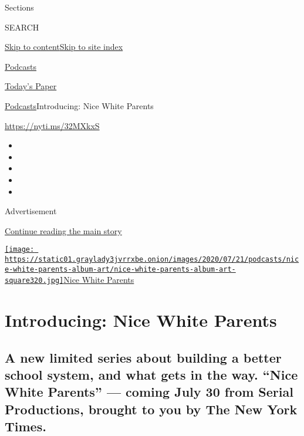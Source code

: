 Sections

SEARCH

\protect\hyperlink{site-content}{Skip to
content}\protect\hyperlink{site-index}{Skip to site index}

\href{https://www.nytimes3xbfgragh.onion/spotlight/podcasts}{Podcasts}

\href{https://myaccount.nytimes3xbfgragh.onion/auth/login?response_type=cookie\&client_id=vi}{}

\href{https://www.nytimes3xbfgragh.onion/section/todayspaper}{Today's
Paper}

\href{/spotlight/podcasts}{Podcasts}\textbar{}Introducing: Nice White
Parents

\url{https://nyti.ms/32MXkxS}

\begin{itemize}
\item
\item
\item
\item
\item
\end{itemize}

Advertisement

\protect\hyperlink{after-top}{Continue reading the main story}

\href{https://www.nytimes3xbfgragh.onion/column/nice-white-parents}{\texttt{[image: https://static01.graylady3jvrrxbe.onion/images/2020/07/21/podcasts/nice-white-parents-album-art/nice-white-parents-album-art-square320.jpg]}Nice
White Parents}

\hypertarget{introducing-nice-white-parents}{%
\section{Introducing: Nice White
Parents}\label{introducing-nice-white-parents}}

\hypertarget{a-new-limited-series-about-building-a-better-school-system-and-what-gets-in-the-way-nice-white-parents--coming-july-30-from-serial-productions-brought-to-you-by-the-new-york-times}{%
\subsection{A new limited series about building a better school system,
and what gets in the way. ``Nice White Parents'' --- coming July 30 from
Serial Productions, brought to you by The New York
Times.}\label{a-new-limited-series-about-building-a-better-school-system-and-what-gets-in-the-way-nice-white-parents--coming-july-30-from-serial-productions-brought-to-you-by-the-new-york-times}}

